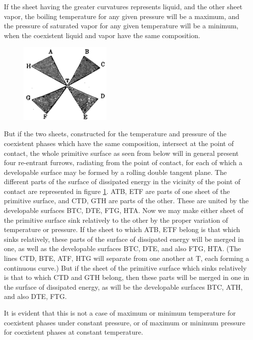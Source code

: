 \documentclass[12pt]{memoir}
\begin{document}
If the sheet having the greater curvatures represents liquid, and the other sheet vapor, the boiling temperature for any given pressure will be a maximum, and the pressure of saturated vapor for any given temperature will be a minimum, when the coexistent liquid and vapor have the same composition.


\begin{figure} %
    \centering
    \includegraphics[width=0.4\textwidth]{fig_7}
    \caption{ }
    \label{fig_7}
\end{figure}
But if the two sheets, constructed for the temperature and pressure of the
coexistent phases which have the same composition, intersect at the point of contact, the whole primitive surface as seen from below will in general present four re-entrant furrows, radiating from the point of contact, for each of which a developable surface may be formed by a rolling double tangent plane. The different parts of the surface of dissipated energy in the vicinity of the point of contact are represented in figure \ref{fig_7}. ATB, ETF are parts of one sheet of the primitive surface, and CTD, GTH are parts of the other. These are united by the developable surfaces BTC,
DTE, FTG, HTA. Now we may make either sheet of the primitive surface sink relatively to the other by the proper variation of temperature or pressure. If the sheet to which ATB, ETF belong is that which sinks relatively, these parts of the surface of dissipated energy will be merged in one, as well as the developable surfaces BTC, DTE, and also FTG, HTA. (The lines CTD, BTE, ATF, HTG will separate from one another at T, each forming a continuous curve.) But if the sheet of the primitive surface which sinks relatively is that to which CTD and GTH belong, then these parts will be merged in one in the surface of dissipated energy, as will be the developable surfaces BTC, ATH, and also DTE, FTG.


It is evident that this is not a case of maximum or minimum temperature for coexistent phases under constant pressure, or of maximum or minimum pressure for coexistent phases at constant temperature.
\end{document}
